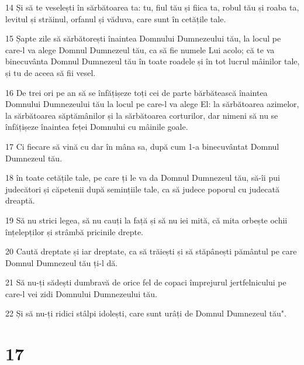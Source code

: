\par 14 Și să te veselești în sărbătoarea ta: tu, fiul tău și fiica ta, robul tău și roaba ta, levitul și străinul, orfanul și văduva, care sunt în cetățile tale.
\par 15 Șapte zile să sărbătorești înaintea Domnului Dumnezeului tău, la locul pe care-l va alege Domnul Dumnezeul tău, ca să fie numele Lui acolo; că te va binecuvânta Domnul Dumnezeul tău în toate roadele și în tot lucrul mâinilor tale, și tu de aceea să fii vesel.
\par 16 De trei ori pe an să se înfățișeze toți cei de parte bărbătească înaintea Domnului Dumnezeului tău la locul pe care-l va alege El: la sărbătoarea azimelor, la sărbătoarea săptămânilor și la sărbătoarea corturilor, dar nimeni să nu se înfățișeze înaintea feței Domnului cu mâinile goale.
\par 17 Ci fiecare să vină cu dar în mâna sa, după cum 1-a binecuvântat Domnul Dumnezeul tău.
\par 18 în toate cetățile tale, pe care ți le va da Domnul Dumnezeul tău, să-îi pui judecători și căpetenii după semințiile tale, ca să judece poporul cu judecată dreaptă.
\par 19 Să nu strici legea, să nu cauți la față și să nu iei mită, că mita orbește ochii înțelepților și strâmbă pricinile drepte.
\par 20 Caută dreptate și iar dreptate, ca să trăiești și să stăpânești pământul pe care Domnul Dumnezeul tău ți-l dă.
\par 21 Să nu-ți sădești dumbravă de orice fel de copaci împrejurul jertfelnicului pe care-l vei zidi Domnului Dumnezeului tău.
\par 22 Și să nu-ți ridici stâlpi idolești, care sunt urâți de Domnul Dumnezeul tău".

\chapter{17}

